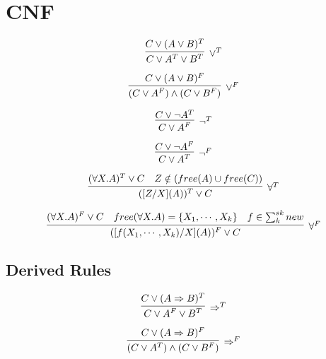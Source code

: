 \section{CNF}

\begin{multicols}{2}
    \noindent
    \begin{minipage}{\linewidth}
        \[
            \infer[\lor^T]
            {C \lor A^T \lor B^T}
            {C \lor (A \lor B)^T}
        \]
    \end{minipage}
    \noindent
    \begin{minipage}{\linewidth}
        \[
            \infer[\lor^F]
            {(C \lor A^F) \land (C \lor B^F)}
            {C \lor (A \lor B)^F}
        \]
    \end{minipage}
\end{multicols}

\begin{multicols}{2}
    \noindent
    \begin{minipage}{\linewidth}
        \[
            \infer[\neg^T]
            {C \lor A^F}
            {C \lor \neg A^T}
        \]
    \end{minipage}
    \noindent
    \begin{minipage}{\linewidth}
        \[
            \infer[\neg^F]
            {C \lor A^T}
            {C \lor \neg A^F}
        \]
    \end{minipage}
\end{multicols}

\noindent
\begin{minipage}{\linewidth}
    \[
        \infer[\forall^T]
        {([Z/X](A))^T \lor C}
        {(\forall X.A)^T \lor C \quad Z \notin (free(A) \cup free(C))}
    \]
\end{minipage}

\noindent
\begin{minipage}{\linewidth}
    \[
        \infer[\forall^F]
        {([f(X_1,\cdots,X_k)/X](A))^F \lor C}
        {(\forall X.A)^F \lor C \quad free(\forall X.A) = \{X_1,\cdots,X_k\} \quad
        f \in \sum_{k}^{sk} new}
    \]
\end{minipage}

\subsection{Derived Rules}

\begin{multicols}{2}
    \noindent
    \begin{minipage}{\linewidth}
        \[
            \infer[\Rightarrow^T]
            {C \lor A^F \lor B^T}
            {C \lor (A \Rightarrow B)^T}
        \]
    \end{minipage}
    \noindent
    \begin{minipage}{\linewidth}
        \[
            \infer[\Rightarrow^F]
            {(C \lor A^T) \land (C \lor B^F)}
            {C \lor (A \Rightarrow B)^F}
        \]
    \end{minipage}
\end{multicols}

